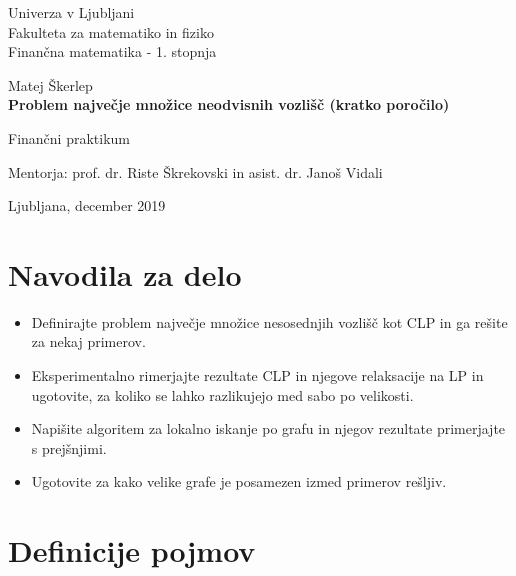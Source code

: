 \documentclass[a4paper, 12 pt]{article}
\theoremstyle{plain}
\theoremstyle{definition}
\theoremstyle{remark}
\begin{document}
\begin{titlepage}
		\begin{center}
		
		\large
		Univerza v Ljubljani\\
		\normalsize
		Fakulteta za matematiko in fiziko\\
		
		\small
		Finančna matematika - 1. stopnja\\
		
		\vspace{5 cm} 
		
		\large
		Matej Škerlep \\
		
		\vspace{0.5cm}
		\Large
		\textbf{Problem največje množice neodvisnih vozlišč (kratko poročilo)}
		
		\vspace{0.5 cm}
		\normalsize
		Finančni praktikum
		
		\vspace{1.5cm}
		\normalsize
		Mentorja: prof. dr. Riste Škrekovski in asist. dr. Janoš Vidali
		
		\vfill
		
		\large Ljubljana, december 2019
		
		\end{center}
\end{titlepage}


\section{Navodila za delo}
\begin{itemize}
\item Definirajte problem največje množice nesosednjih vozlišč kot CLP in ga rešite za nekaj primerov. 
\item Eksperimentalno rimerjajte rezultate CLP in njegove relaksacije na LP in ugotovite, za koliko se lahko razlikujejo med sabo po velikosti.
\item Napišite algoritem za lokalno iskanje po grafu in njegov rezultate primerjajte s prejšnjimi. 
\item Ugotovite za kako velike grafe je posamezen izmed primerov rešljiv.
\end{itemize}



\section{Definicije pojmov}
\end{document}

